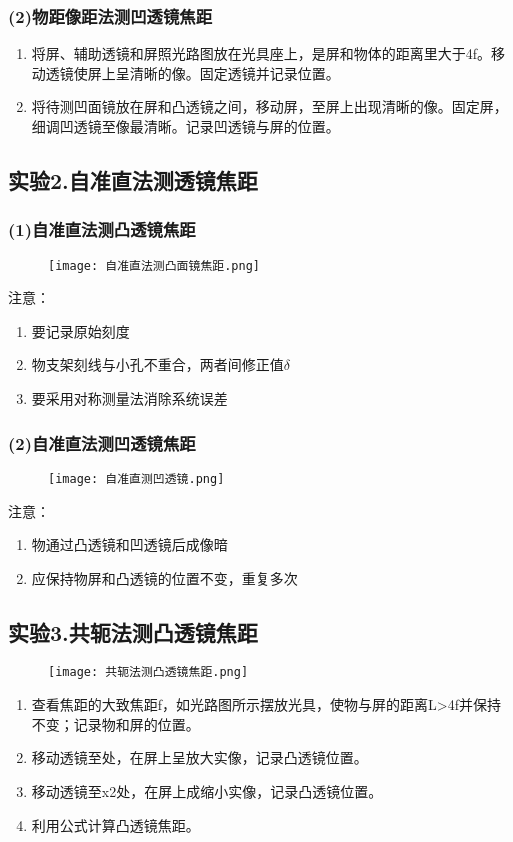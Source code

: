 \documentclass[11pt,a4paper,oneside]{article}
\begin{document}
\subsubsection*{(2)物距像距法测凹透镜焦距}
\begin{enumerate}
\item 将屏、辅助透镜和屏照光路图放在光具座上，是屏和物体的距离里大于4f。移动透镜使屏上呈清晰的像。固定透镜并记录位置。
\item 将待测凹面镜放在屏和凸透镜之间，移动屏，至屏上出现清晰的像。固定屏，细调凹透镜至像最清晰。记录凹透镜与屏的位置。
\end{enumerate}

\subsection*{实验2.自准直法测透镜焦距}
\subsubsection*{(1)自准直法测凸透镜焦距}
\begin{figure}[H]
 \centering
  \texttt{[image: 自准直法测凸面镜焦距.png]}
\end{figure}
注意：
\begin{enumerate}
	\item 要记录原始刻度
	\item 物支架刻线与小孔不重合，两者间修正值$\delta$
	\item 要采用对称测量法消除系统误差
\end{enumerate}

\subsubsection*{(2)自准直法测凹透镜焦距}
\begin{figure}[H]
 \centering
  \texttt{[image: 自准直测凹透镜.png]}
\end{figure}
注意：
\begin{enumerate}
	\item 物通过凸透镜和凹透镜后成像暗
	\item 应保持物屏和凸透镜的位置不变，重复多次
\end{enumerate}

\subsection*{实验3.共轭法测凸透镜焦距}
\begin{figure}[H]
 \centering
  \texttt{[image: 共轭法测凸透镜焦距.png]}
\end{figure}
\begin{enumerate}
\item 查看焦距的大致焦距f，如光路图所示摆放光具，使物与屏的距离L>4f并保持不变；记录物和屏的位置。
\item 移动透镜至处，在屏上呈放大实像，记录凸透镜位置。
\item 移动透镜至x2处，在屏上成缩小实像，记录凸透镜位置。
\item 利用公式计算凸透镜焦距。
\end{enumerate}
\end{document}
